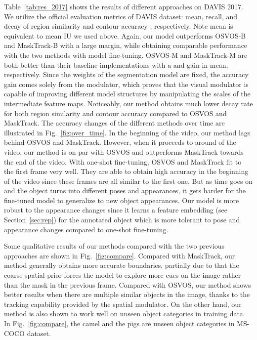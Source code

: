 \documentclass[10pt,twocolumn,letterpaper]{article}
\begin{document}
Table~\ref{tab:res_2017} shows the results of different approaches on DAVIS 2017. We utilize the official evaluation metrics of DAVIS dataset: mean, recall, and decay of region similarity  and contour accuracy , respectively. Note  mean is equivalent to mean IU we used above. Again, our model outperforms OSVOS-B and MaskTrack-B with a large margin, while obtaining comparable performance with the two methods with model fine-tuning. OSVOS-M and MaskTrack-M are both better than their baseline implementations with a  and  gain in  mean, respectively. Since the weights of the segmentation model are fixed, the accuracy gain comes solely from the modulator, which proves that the visual modulator is capable of improving different model structures by manipulating the scales of the intermediate feature maps. Noticeably, our method obtains much lower decay rate for both region similarity and contour accuracy compared to OSVOS and MaskTrack. The accuracy changes of the different methods over time are illustrated in Fig.~\ref{fig:over_time}. In the beginning of the video, our method lags behind OSVOS and MaskTrack. However, when it proceeds to around  of the video, our method is on par with OSVOS and outperforms MaskTrack towards the end of the video. With one-shot fine-tuning, OSVOS and MaskTrack fit to the first frame very well. They are able to obtain high accuracy in the beginning of the video since these frames are all similar to the first one. But as time goes on and the object turns into different poses and appearances, it gets harder for the fine-tuned model to generalize to new object appearances. Our model is more robust to the appearance changes since it learns a feature embedding (see Section~\ref{sec:rep}) for the annotated object which is more tolerant to pose and appearance changes compared to one-shot fine-tuning.
                                                                                                                                                                                                       
Some qualitative results of our methods compared with the two previous approaches are shown in Fig.~\ref{fig:compare}. Compared with MaskTrack, our method generally obtains more accurate boundaries, partially due to that the coarse spatial prior forces the model to explore more cues on the image rather than the mask in the previous frame. Compared with OSVOS, our method shows better results when there are multiple similar objects in the image, thanks to the tracking capability provided by the spatial modulator. On the other hand, our method is also shown to work well on unseen object categories in training data. In Fig.~\ref{fig:compare}, the camel and the pigs are unseen object categories in MS-COCO dataset.
\end{document}

